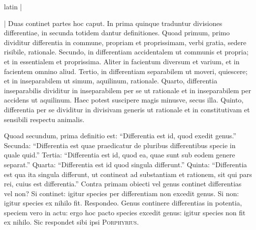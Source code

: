 \begin{otherlanguage*}{latin}
\pstart
\textnormal{|}  
\pend

\pstart
{}
\pend

\pstart
\noindent%
\textnormal{|} Duas continet partes hoc caput. In prima quinque traduntur divisiones differentiae, in secunda totidem dantur definitiones. Quoad primum, primo dividitur differentia in commune, propriam et proprissimam, verbi gratia, sedere risibile, rationale. Secundo, in differentiam accidentalem ut communis et propria; et in essentialem et proprissima. Aliter in facientum diversum et varium, et in facientem omnino aliud. Tertio, in differentiam separabilem ut moveri, quiescere; et in inseparabilem ut simum, aquilinum, rationale. Quarto, differentia inseparabilis dividitur in inseparabilem per se ut rationale et in inseparabilem per accidens ut aquilinum. Haec potest suscipere magis minusve, secus illa. Quinto, differentia per se dividitur in divisivam generis ut rationale et in constitutivam et sensibili respectu animalis. 
\pend

\pstart
Quoad secundum, prima definitio est:
\enquote{Differentia est id, quod exedit genus.} Secunda:
\enquote{Differentia est quae praedicatur de pluribus differentibus specie in quale quid.} Tertia:
\enquote{Differentia est id, quod ea, quae sunt sub eodem genere separat.} Quarta:
\enquote{Differentia est id quod singula differunt.} Quinta:
\enquote{Differentia est qua ita singula differunt, ut contineat ad substantiam et rationem, sit qui pars rei, cuius est differentia.} Contra primam obiecti vel genus continet differentias vel non? Si continet:
igitur species per differentiam non excedit genus. Si non:
igitur species ex nihilo fit. Respondeo. Genus continere differentias in potentia, speciem vero in actu:
ergo hoc pacto species excedit genus:
igitur species non fit ex nihilo. Sic respondet sibi ipsi \textsc{Porphyrius}. 
\pend

\pstart
{}
\pend


\end{otherlanguage*}
